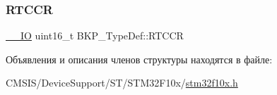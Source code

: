 \mbox{\label{struct_b_k_p___type_def_a4f876006771eb447cb9a8bbb18a7aa10}} 
\subsubsection{\texorpdfstring{RTCCR}{RTCCR}}
{\footnotesize\ttfamily \mbox{\hyperlink{group___c_m_s_i_s___c_m3__core__definitions_gaec43007d9998a0a0e01faede4133d6be}{\+\_\+\+\_\+\+IO}} uint16\+\_\+t B\+K\+P\+\_\+\+Type\+Def\+::\+R\+T\+C\+CR}



Объявления и описания членов структуры находятся в файле\+:\begin{DoxyCompactItemize}
\item 
C\+M\+S\+I\+S/\+Device\+Support/\+S\+T/\+S\+T\+M32\+F10x/\mbox{\hyperlink{stm32f10x_8h}{stm32f10x.\+h}}\end{DoxyCompactItemize}
